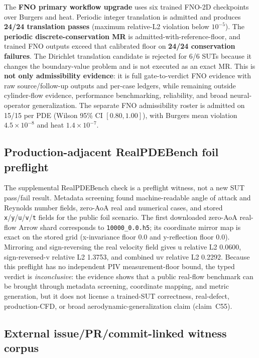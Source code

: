 \documentclass[preprint,12pt]{elsarticle}
\begin{document}
The \textbf{FNO primary workflow upgrade} uses six trained FNO-2D checkpoints over Burgers and heat. Periodic integer translation is admitted and produces \textbf{24/24 translation passes} (maximum relative-L2 violation below $10^{-5}$). The \textbf{periodic discrete-conservation MR} is admitted-with-reference-floor, and trained FNO outputs exceed that calibrated floor on \textbf{24/24 conservation failures}. The Dirichlet translation candidate is rejected for 6/6 SUTs because it changes the boundary-value problem and is not executed as an exact MR. This is \textbf{not only admissibility evidence}: it is full gate-to-verdict FNO evidence with raw source/follow-up outputs and per-case ledgers, while remaining outside cylinder-flow evidence, performance benchmarking, reliability, and broad neural-operator generalization. The separate FNO admissibility roster is admitted on 15/15 per PDE (Wilson 95\% CI $[0.80, 1.00]$), with Burgers mean violation $4.5\times10^{-8}$ and heat $1.4\times10^{-7}$.

\subsection{Production-adjacent RealPDEBench foil preflight}
\label{subsec:realpdebench-foil-preflight}

The supplemental RealPDEBench check is a preflight witness, not a new SUT
pass/fail result. Metadata screening found machine-readable angle of attack and
Reynolds number fields, zero-AoA real and numerical cases, and stored
\texttt{x}/\texttt{y}/\texttt{u}/\texttt{v}/\texttt{t} fields for the public
foil scenario. The first downloaded zero-AoA real-flow Arrow shard corresponds
to \texttt{10000\_0.0.h5}; its coordinate mirror map is exact on the stored grid
(x-invariance floor 0.0 and y-reflection floor 0.0). Mirroring and
sign-reversing the real velocity field gives u relative L2 0.0600,
sign-reversed-v relative L2 1.3753, and combined uv relative L2 0.2292. Because
this preflight has no independent PIV measurement-floor bound, the typed verdict
is \emph{inconclusive}: the evidence shows that a public real-flow benchmark can
be brought through metadata screening, coordinate mapping, and metric generation,
but it does not license a trained-SUT correctness, real-defect, production-CFD,
or broad aerodynamic-generalization claim (claim~C55).

\subsection{External issue/PR/commit-linked witness corpus}
\label{subsec:external-defect-witness-corpus}
\end{document}
